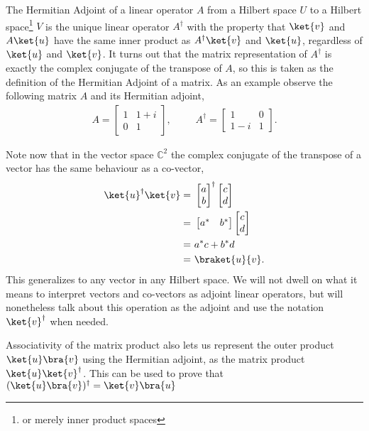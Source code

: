 The Hermitian Adjoint of a linear operator $A$ from a Hilbert space $U$ to a Hilbert space\footnote{or merely inner product spaces} $V$ is the unique linear operator $A^\dagger$ with the property that $\ket{v}$ and $A\ket{u}$ have the same inner product as $A^\dagger\ket{v}$ and $\ket{u}$, regardless of $\ket{u}$ and $\ket{v}$. It turns out that the matrix representation of $A^\dagger$ is exactly the complex conjugate of the transpose of $A$, so this is taken as the definition of the Hermitian Adjoint of a matrix. As an example observe the following matrix $A$ and its Hermitian adjoint,
\begin{align*}
	A = \left[\begin{matrix}
		1 & 1+i\\
		0 & 1
	\end{matrix}\right],
	&&&
	A^\dagger = \left[\begin{matrix}
		1 & 0\\
		1-i & 1
	\end{matrix}\right].
\end{align*}

Note now that in the vector space $\mathbb{C}^2$ the complex conjugate of the transpose of a vector has the same behaviour as a co-vector,
\begin{align*}
	\ket{u}^\dagger\ket{v}
	=&\ 
	\left[\begin{matrix}
		a\\
		b
	\end{matrix}\right]^\dagger
	\left[\begin{matrix}
		c\\
		d
	\end{matrix}\right]
	\\=&\ 
	\left[\begin{matrix}
		a^*&b^*
	\end{matrix}\right]
	\left[\begin{matrix}
		c\\
		d
	\end{matrix}\right]
	\\=&\ a^*c+b^*d
	\\=&\ \braket{u}{v}.
\end{align*}
This generalizes to any vector in any Hilbert space. We will not dwell on what it means to interpret vectors and co-vectors as adjoint linear operators, but will nonetheless talk about this operation as the adjoint and use the notation $\ket{v}^\dagger$ when needed.

Associativity of the matrix product also lets us represent the outer product $\ket{u}\bra{v}$ using the Hermitian adjoint, as the matrix product $\ket{u}\ket{v}^\dagger$. This can be used to prove that
$(\ket{u}\bra{v})^\dagger = \ket{v}\bra{u}$

